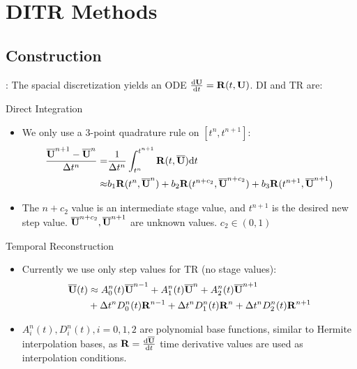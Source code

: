\documentclass[aspectratio=169,serif]{beamer} %
\begin{document}
\section{DITR Methods}
\subsection{Construction}


\begin{frame}[allowframebreaks]{\secname: \subsecname}
  The spacial discretization yields an ODE $\dv{\mathbf{U}}{t}=\mathbf{R}(t,\mathbf{U})$.
  DI and TR are:
  \begin{block}{Direct Integration}
    \begin{itemize}
      \item We only use a 3-point quadrature
            rule on $[t^n,t^{n+1}]$:
            \begin{equation}
              \label{eq:Quad3}
              \begin{aligned}
                \frac{\overline{\mathbf{U}}^{n+1} - \overline{\mathbf{U}}^{n}}{{\Delta} t^n} = & \frac{1}{{\Delta} t^n}
                \int_{t^n}^{t^{n+1}}{
                \mathbf{R}(t, \overline{\mathbf{U}}) \dd t
                }                                                           \\ \approx &
                b_1\mathbf{R}(t^n, \overline{\mathbf{U}}^n)
                +
                b_2\mathbf{R}(t^{n+c_2}, \overline{\mathbf{U}}^{n+c_2})
                +
                b_3\mathbf{R}(t^{n+1}, \overline{\mathbf{U}}^{n+1})
              \end{aligned}
            \end{equation}
      \item The ${n+c_2}$ value is an intermediate stage value, and $t^{n+1}$ is the desired new step value.
            $\overline{\mathbf{U}}^{n+c_2},\overline{\mathbf{U}}^{n+1}$ are unknown values.
            $c_2\in (0,1)$
    \end{itemize}
  \end{block}


  \begin{block}{Temporal Reconstruction}
    \begin{itemize}
      \item Currently we use only step values for TR (no stage values):
            \begin{equation}
              \begin{aligned}
                \label{eq:TR}
                \overline{\mathbf{U}}(t) & \approx
                A^n_0(t)\overline{\mathbf{U}}^{n - 1} +
                A^n_1(t)\overline{\mathbf{U}}^{n} +
                A^n_2(t)\overline{\mathbf{U}}^{n + 1}
                \\ & +
                {\Delta} t^n D^n_0(t)\mathbf{R}^{n - 1} +
                {\Delta} t^n D^n_1(t)\mathbf{R}^{n} +
                {\Delta} t^n D^n_2(t)\mathbf{R}^{n + 1}
              \end{aligned}
            \end{equation}
      \item $A^n_i(t), D^n_i(t), i=0,1,2$
            are polynomial base functions, similar to Hermite
            interpolation bases, as $\mathbf{R}=\dv{\overline{\mathbf{U}}}{t}$ time derivative values are
            used as interpolation conditions.
    \end{itemize}
  \end{block}



\end{frame}
\end{document}
